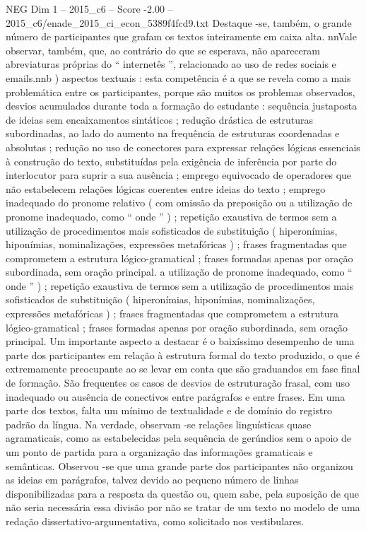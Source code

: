 \begin{textsample}{NEG Dim 1 – 2015\_c6 – Score -2.00 – 2015\_c6/enade\_2015\_ci\_econ\_5389f4fcd9.txt}
Destaque -se, também, o grande número de participantes que grafam os textos inteiramente em caixa alta. nnVale observar, também, que, ao contrário do que se esperava, não apareceram abreviaturas próprias do “ internetês ”, relacionado ao uso de redes sociais e emails.nnb ) aspectos textuais : esta competência é a que se revela como a mais problemática entre os participantes, porque são muitos os problemas observados, desvios acumulados durante toda a formação do estudante : sequência justaposta de ideias sem encaixamentos sintáticos ; redução drástica de estruturas subordinadas, ao lado do aumento na frequência de estruturas coordenadas e absolutas ; redução no uso de conectores para expressar relações lógicas essenciais à construção do texto, substituídas pela exigência de inferência por parte do interlocutor para suprir a sua ausência ; emprego equivocado de operadores que não estabelecem relações lógicas coerentes entre ideias do texto ; emprego inadequado do pronome relativo ( com omissão da preposição ou a utilização de pronome inadequado, como “ onde ” ) ; repetição exaustiva de termos sem a utilização de procedimentos mais sofisticados de substituição ( hiperonímias, hiponímias, nominalizações, expressões metafóricas ) ; frases fragmentadas que comprometem a estrutura lógico-gramatical ; frases formadas apenas por oração subordinada, sem oração principal. a utilização de pronome inadequado, como “ onde ” ) ; repetição exaustiva de termos sem a utilização de procedimentos mais sofisticados de substituição ( hiperonímias, hiponímias, nominalizações, expressões metafóricas ) ; frases fragmentadas que comprometem a estrutura lógico-gramatical ; frases formadas apenas por oração subordinada, sem oração principal.
Um importante aspecto a destacar é o baixíssimo desempenho de uma parte dos participantes em relação à estrutura formal do texto produzido, o que é extremamente preocupante ao se levar em conta que são graduandos em fase final de formação.
São frequentes os casos de desvios de estruturação frasal, com uso inadequado ou ausência de conectivos entre parágrafos e entre frases.
Em uma parte dos textos, falta um mínimo de textualidade e de domínio do registro padrão da língua.
Na verdade, observam -se relações linguísticas quase agramaticais, como as estabelecidas pela sequência de gerúndios sem o apoio de um ponto de partida para a organização das informações gramaticais e semânticas.
Observou -se que uma grande parte dos participantes não organizou as ideias em parágrafos, talvez devido ao pequeno número de linhas disponibilizadas para a resposta da questão ou, quem sabe, pela suposição de que não seria necessária essa divisão por não se tratar de um texto no modelo de uma redação dissertativo-argumentativa, como solicitado nos vestibulares.

\end{textsample}
